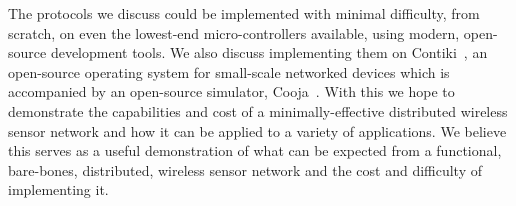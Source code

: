 The protocols we discuss could be implemented with minimal difficulty, from scratch, on even the lowest-end micro-controllers
available, using modern, open-source development tools.  We also discuss implementing them on Contiki~\cite{contiki},
an open-source operating system for small-scale networked devices which is accompanied by an open-source simulator,
Cooja~\cite{cooja}.  With this we hope to demonstrate the capabilities and cost of a minimally-effective distributed
wireless sensor network and how it can be applied to a variety of applications.  We believe this serves as a useful demonstration
of what can be expected from a functional, bare-bones, distributed, wireless sensor network and the cost and
difficulty of implementing it.

